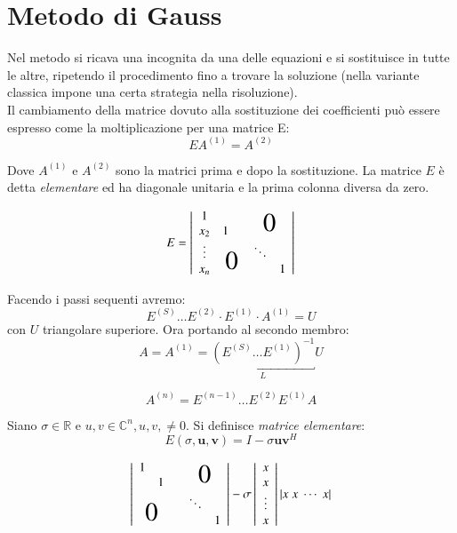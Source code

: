 \section{Metodo di Gauss}
Nel metodo si ricava una incognita da una delle equazioni e si
sostituisce in tutte le altre, ripetendo il procedimento fino a
trovare la soluzione (nella variante classica impone una certa
strategia nella risoluzione).\\
Il cambiamento della matrice dovuto alla sostituzione dei coefficienti
può essere espresso come la moltiplicazione per una matrice E:
$$ E A^{(1)} = A^{(2)} $$

Dove  $A^{(1)}$ e $A^{(2)}$ sono la matrici prima e dopo la sostituzione.
La matrice $E$ \`e detta \emph{elementare} ed ha diagonale unitaria e la
prima colonna diversa da zero.

\[
E = \left |
\begin{array}{ccccc}
1      &   &  & \multicolumn{2}{c}{\multirow{2}{*}{\huge $0$}}      \\
x_2    & 1 &  &                                                     \\
\vdots & \multicolumn{2}{c}{\multirow{2}{*}{\huge $0$}} & \ddots &  \\
x_n    &   &  & &1
\end{array}
\right |
\]

Facendo i passi sequenti avremo:
$$ E^{(S)} \ldots E^{(2)} \cdot E^{(1)} \cdot A^{(1)} = U $$
con $U$ triangolare superiore.
Ora portando al secondo membro:
$$ A = A^{(1)} = \underbracket{(E^{(S)} \ldots E^{(1)})^{-1}}_{L} U $$


$$ A^{(n)} = E^{(n-1)}\ldots E^{(2)} E^{(1)}A$$
\begin{defn}
Siano $\sigma \in \mathbb{R}$ e $u,v \in \mathbb{C}^n, u,v, \neq
0$. Si definisce \emph{matrice elementare}:
$$ E(\sigma, \mathbf{u},\mathbf{v}) = 
   I - \sigma \mathbf{uv}^{H} $$


\[\left | \begin{array}{ccccc}
    1  &   &  & \multicolumn{2}{c}{\multirow{2}{*}{\huge $0$}}      \\
       & 1 &  &                                                     \\
    \multicolumn{2}{c}{\multirow{2}{*}{\huge $0$}}  &   & \ddots &  \\
       &  & & & 1
\end{array} \right |
-\sigma
\left | \begin{array}{c}
    x \\
    x \\
    \vdots \\
    x
\end{array} \right |
|x \; x \; \cdots \; x|
\]
\end{defn}

